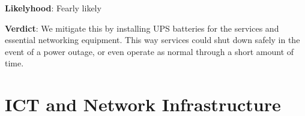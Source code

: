 \textbf{Likelyhood}: Fearly likely

\textbf{Verdict}: We mitigate this by installing UPS batteries for the services and essential networking equipment. This way services could shut down safely in the event of a power outage, or even operate as normal through a short amount of time.



\section{ICT and Network Infrastructure}

%




